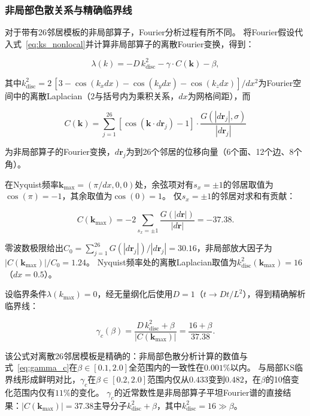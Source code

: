 \documentclass[sn-nature,pdflatex]{sn-jnl}
\begin{document}
\subsubsection{非局部色散关系与精确临界线}

对于带有26邻居模板的非局部算子，Fourier分析过程有所不同。
将Fourier假设代入式~\eqref{eq:ks_nonlocal}并计算非局部算子的离散Fourier变换，得到：

\begin{equation}
\label{eq:nonlocal_dispersion}
\lambda(k) = -D\,k^2_{\text{disc}} - \gamma \cdot C(\mathbf{k}) - \beta,
\end{equation}

其中$k^2_{\text{disc}} = 2\,[3 - \cos(k_x dx) - \cos(k_y dx) - \cos(k_z dx)]/dx^2$为Fourier空间中的离散Laplacian（$2$与括号内为乘积关系，$dx$为网格间距），而

\begin{equation}
C(\mathbf{k}) = \sum_{j=1}^{26} [\cos(\mathbf{k} \cdot d\mathbf{r}_j) - 1] \cdot \frac{G(|d\mathbf{r}_j|, \sigma)}{|d\mathbf{r}_j|}
\end{equation}

为非局部算子的Fourier变换，$d\mathbf{r}_j$为到26个邻居的位移向量（6个面、12个边、8个角）。

在Nyquist频率$\mathbf{k}_{\max} = (\pi/dx, 0, 0)$处，余弦项对有$s_x = \pm 1$的邻居取值为$\cos(\pi) = -1$，其余取值为$\cos(0) = 1$。
仅$s_x = \pm 1$的邻居对求和有贡献：

\begin{equation}
C(\mathbf{k}_{\max}) = -2 \sum_{s_x = \pm 1} \frac{G(|d\mathbf{r}|)}{|d\mathbf{r}|} = -37.38.
\end{equation}

零波数极限给出$C_0 = \sum_{j=1}^{26} G(|d\mathbf{r}_j|)/|d\mathbf{r}_j| = 30.16$，非局部放大因子为$|C(\mathbf{k}_{\max})|/C_0 = 1.24$。
Nyquist频率处的离散Laplacian取值为$k^2_{\text{disc}}(\mathbf{k}_{\max}) = 16$（$dx = 0.5$）。

设临界条件$\lambda(k_{\max}) = 0$，经无量纲化后使用$D = 1$（$t \to D t / L^2$），得到精确解析临界线：

\begin{equation}
\label{eq:gamma_c}
\gamma_c(\beta) = \frac{D\,k^2_{\text{disc}} + \beta}{|C(\mathbf{k}_{\max})|} = \frac{16 + \beta}{37.38}.
\end{equation}

该公式对离散26邻居模板是精确的：非局部色散分析计算的数值与式~\eqref{eq:gamma_c}在$\beta \in [0.1, 2.0]$全范围内的一致性在$0.001\%$以内。
与局部KS临界线形成鲜明对比，$\gamma_c$在$\beta \in [0.2, 2.0]$范围内仅从$0.433$变到$0.482$，在$\beta$的10倍变化范围内仅有$11\%$的变化。
$\gamma_c$的近常数性是非局部算子平坦Fourier谱的直接结果：$|C(\mathbf{k}_{\max})| = 37.38$主导分子$k^2_{\text{disc}} + \beta$，其中$k^2_{\text{disc}} = 16 \gg \beta$。
\end{document}
